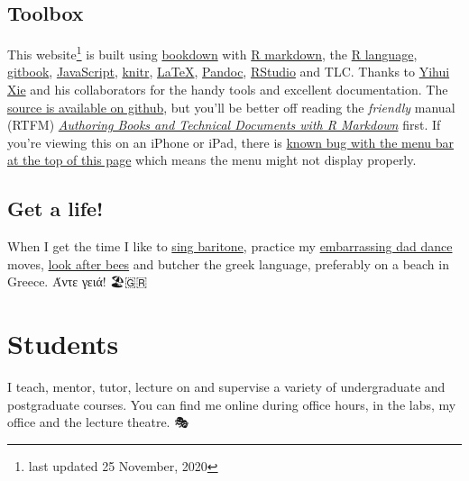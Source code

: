 \documentclass[
  12pt,
]{book}
\begin{document}
\hypertarget{toolbox}{%
\section*{Toolbox}\label{toolbox}}

This website\footnote{last updated 25 November, 2020} is built using \href{https://bookdown.org}{bookdown} with \href{https://rmarkdown.rstudio.com/}{R markdown}, the \href{https://en.wikipedia.org/wiki/R_(programming_language)}{R language}, \href{https://www.gitbook.com}{gitbook}, \href{https://en.wikipedia.org/wiki/JavaScript}{JavaScript}, \href{https://en.wikipedia.org/wiki/Knitr}{knitr}, \href{https://en.wikipedia.org/wiki/LaTeX}{LaTeX}, \href{https://pandoc.org/}{Pandoc}, \href{https://www.rstudio.com/}{RStudio} and TLC. Thanks to \href{https://yihui.name/}{Yihui Xie} and his collaborators for the handy tools and excellent documentation. The \href{https://github.com/dullhunk/hulled}{source is available on github}, but you'll be better off reading the \emph{friendly} manual (RTFM) \emph{\href{https://bookdown.org/yihui/bookdown/}{Authoring Books and Technical Documents with R Markdown}} first. If you're viewing this on an iPhone or iPad, there is \href{https://github.com/rstudio/bookdown/issues/60}{known bug with the menu bar at the top of this page} which means the menu might not display properly.

\hypertarget{get-a-life}{%
\section*{Get a life!}\label{get-a-life}}

When I get the time I like to \href{https://en.wikipedia.org/wiki/Baritone}{sing baritone}, practice my \protect\hyperlink{tuningcomplete}{embarrassing dad dance} moves, \href{http://beelife.cs.manchester.ac.uk/}{look after bees} and butcher the greek language, preferably on a beach in Greece. Άντε γειά! 🏖️🇬🇷

\hypertarget{teaching}{%
\chapter{Students}\label{teaching}}

I teach, mentor, tutor, lecture on and supervise a variety of undergraduate and postgraduate courses. You can find me online during office hours, in the labs, my office and the lecture theatre. 🎭
\end{document}
